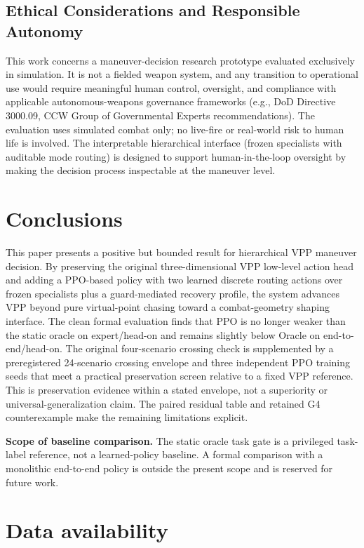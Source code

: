 \documentclass[5p,times]{elsarticle} %
\begin{document}
\subsection{Ethical Considerations and Responsible Autonomy}

This work concerns a maneuver-decision research prototype evaluated exclusively in simulation. It is not a fielded weapon system, and any transition to operational use would require meaningful human control, oversight, and compliance with applicable autonomous-weapons governance frameworks (e.g., DoD Directive 3000.09, CCW Group of Governmental Experts recommendations). The evaluation uses simulated combat only; no live-fire or real-world risk to human life is involved. The interpretable hierarchical interface (frozen specialists with auditable mode routing) is designed to support human-in-the-loop oversight by making the decision process inspectable at the maneuver level.

\section{Conclusions}

This paper presents a positive but bounded result for hierarchical VPP maneuver decision. By preserving the original three-dimensional VPP low-level action head and adding a PPO-based policy with two learned discrete routing actions over frozen specialists plus a guard-mediated recovery profile, the system advances VPP beyond pure virtual-point chasing toward a combat-geometry shaping interface. The clean formal evaluation finds that PPO is no longer weaker than the static oracle on expert/head-on and remains slightly below Oracle on end-to-end/head-on. The original four-scenario crossing check is supplemented by a preregistered 24-scenario crossing envelope and three independent PPO training seeds that meet a practical preservation screen relative to a fixed VPP reference. This is preservation evidence within a stated envelope, not a superiority or universal-generalization claim. The paired residual table and retained G4 counterexample make the remaining limitations explicit.

\textbf{Scope of baseline comparison.} The static oracle task gate is a privileged task-label reference, not a learned-policy baseline. A formal comparison with a monolithic end-to-end policy is outside the present scope and is reserved for future work.

\section*{Data availability}
\label{sec:data}
\end{document}
